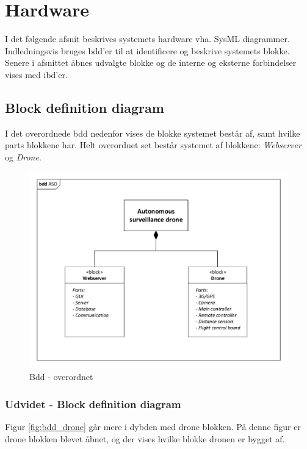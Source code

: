 \chapter{Hardware}

I det følgende afsnit beskrives systemets hardware vha. SysML diagrammer. 
Indledningsvis bruges bdd'er til at identificere og beskrive systemets blokke. Senere i afsnittet åbnes udvalgte blokke og de interne og eksterne forbindelser vises med ibd'er.

\section{Block definition diagram}
I det overordnede bdd nedenfor vises de blokke systemet består af, samt hvilke parts blokkene har. Helt overordnet set består systemet af blokkene: \textit{Webserver} og \textit{Drone}. 

\begin{figure}[H]
\centering
\includegraphics[width=1\textwidth]{Billeder/BDD/bdd_overordnet.pdf}
\vspace{-1cm}
\caption{Bdd - overordnet}
\label{fig:bdd_overordnet}
\end{figure}

\newpage
\subsection{Udvidet - Block definition diagram}
Figur \ref{fig:bdd_drone} går mere i dybden med drone blokken. På denne figur er drone blokken blevet åbnet, og der vises hvilke blokke dronen er bygget af. 

